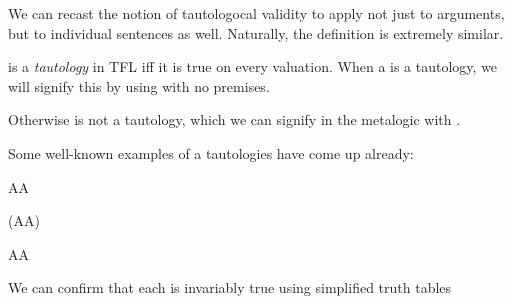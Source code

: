 We can recast the notion of tautologocal validity to apply not just to
arguments, but to individual sentences as well. Naturally, the definition is
extremely similar.

\begin{definition}[Tautology]
  \label{def:tfl-tautology}
  \ephi is a \emph{tautology} in TFL iff it is true on every valuation. When
  a \ephi is a tautology, we will signify this by using \eentails with no
  premises.

  \begin{argument}
    \item[ ] \eentails\ephi
  \end{argument}

  Otherwise \ephi is not a tautology, which we can signify in the metalogic with
  \enotentails.
  
  \begin{argument}
    \item[ ] \enotentails\ephi
  \end{argument}
  
\end{definition}

Some well-known examples of a tautologies have come up already:

\begin{argument}
\item[\textbf{LEM:}] A\eor\enot A
\item[\textbf{LNC:}] \enot(A\eand\enot A)
\item[\textbf{DN:}]  \enot\enot A\eiff A  
\end{argument}

We can confirm that each is invariably true using simplified truth tables


